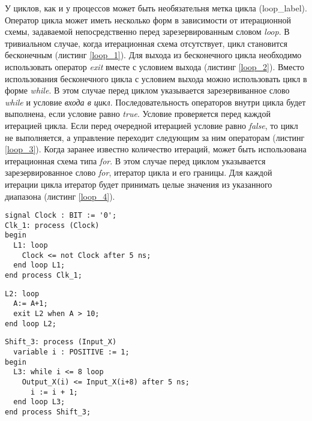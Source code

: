 У циклов, как и у процессов может быть необязательня метка цикла (loop\_label). Оператор цикла может иметь несколько форм в зависимости от итерационной схемы, задаваемой непосредственно перед зарезервированным словом \emph{loop}. В тривиальном случае, когда итерационная схема отсутствует, цикл становится бесконечным (листинг \ref{loop_1}). Для выхода из бесконечного цикла необходимо использовать оператор \emph{exit} вместе с условием выхода (листинг \ref{loop_2}). Вместо использования бесконечного цикла с условием выхода можно использовать цикл в форме \emph{while}. В этом случае перед циклом указывается зарезервиванное слово \emph{while} и условие \emph{входа в цикл}. Последовательность операторов внутри цикла будет выполнена, если условие равно \emph{true}. Условие проверяется перед каждой итерацией цикла. Если перед очередной итерацией условие равно \emph{false}, то цикл не выполняется, а управление переходит следующим за ним операторам (листинг \ref{loop_3}). Когда заранее известно количество итераций, может быть использована итерационная схема типа \emph{for}. В этом случае перед циклом указывается зарезервированное слово \emph{for}, итератор цикла и его границы. Для каждой итерации цикла итератор будет принимать целые значения из указанного диапазона (листинг \ref{loop_4}).


\begin{Code}
\begin{lstlisting}[caption=Бесконечный цикл, label=loop_1]
signal Clock : BIT := '0';
Clk_1: process (Clock)
begin
  L1: loop
    Clock <= not Clock after 5 ns;
  end loop L1;
end process Clk_1;
\end{lstlisting}
\end{Code}

\begin{Code}
\begin{lstlisting}[caption=Бесконечный цикл с условием выхода, label=loop_2]
L2: loop
  A:= A+1;
  exit L2 when A > 10;
end loop L2;
\end{lstlisting}
\end{Code}

\begin{Code}
\begin{lstlisting}[caption=Цикл While, label=loop_3]
Shift_3: process (Input_X)
  variable i : POSITIVE := 1;
begin
  L3: while i <= 8 loop
    Output_X(i) <= Input_X(i+8) after 5 ns;
      i := i + 1;
  end loop L3;
end process Shift_3;
\end{lstlisting}
\end{Code}

